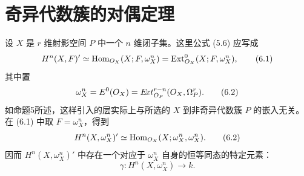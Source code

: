 \section{奇异代数簇的对偶定理}
设 $X$ 是 $r$ 维射影空间 $P$ 中一个 $n$ 维闭子集。这里公式 (5.6) 应写成
\begin{equation}
H^n(X,F)'\simeq\operatorname{Hom}_{O_X}(X;F,\omega_X^n)
=\operatorname{Ext}_{O_X}^{0}(X;F,\omega_X^n),\tag{6.1}
\end{equation}
其中置
\begin{equation}
\omega_X^n=E^0(O_X)=E\!xt_{O_P}^{r-n}(O_X,\Omega_P^r).
\tag{6.2}
\end{equation}
如命题5所述，这样引入的层实际上与所选的 $X$ 到非奇异代数簇 $P$ 的嵌入无关。在 (6.1) 中取 $F=\omega_X^n$，得到
\begin{equation}
H^n(X,\omega_X^n)'\simeq
\operatorname{Hom}_{O_X}(X;\omega_X^n,\omega_X^n).
\tag{6.2}
\end{equation}
因而 $H^n(X,\omega_X^n)'$ 中存在一个对应于 $\omega_X^n$ 自身的恒等同态的特定元素：
\begin{equation}
\gamma:H^n(X,\omega_X^n)\longrightarrow k.\tag{6.3}
\end{equation}

